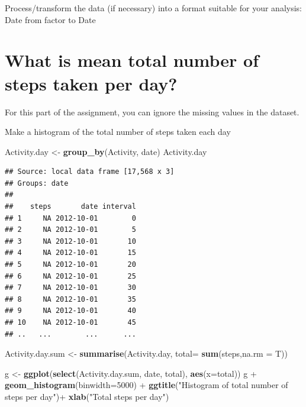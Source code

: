 \documentclass[]{article}
\newenvironment{Shaded}{\begin{snugshade}}{\end{snugshade}}
\newcommand{\KeywordTok}[1]{\textcolor[rgb]{0.13,0.29,0.53}{\textbf{{#1}}}}
\newcommand{\DataTypeTok}[1]{\textcolor[rgb]{0.13,0.29,0.53}{{#1}}}
\newcommand{\DecValTok}[1]{\textcolor[rgb]{0.00,0.00,0.81}{{#1}}}
\newcommand{\StringTok}[1]{\textcolor[rgb]{0.31,0.60,0.02}{{#1}}}
\newcommand{\CommentTok}[1]{\textcolor[rgb]{0.56,0.35,0.01}{\textit{{#1}}}}
\newcommand{\NormalTok}[1]{{#1}}
\begin{document}
Process/transform the data (if necessary) into a format suitable for
your analysis: Date from factor to Date

\begin{Shaded}
\end{Shaded}

\section{What is mean total number of steps taken per
day?}\label{what-is-mean-total-number-of-steps-taken-per-day}

For this part of the assignment, you can ignore the missing values in
the dataset.

Make a histogram of the total number of steps taken each day

\begin{Shaded}
\begin{Highlighting}[]
\NormalTok{Activity.day <-}\StringTok{ }\KeywordTok{group_by}\NormalTok{(Activity, date) }
\NormalTok{Activity.day}
\end{Highlighting}
\end{Shaded}

\begin{verbatim}
## Source: local data frame [17,568 x 3]
## Groups: date
## 
##    steps       date interval
## 1     NA 2012-10-01        0
## 2     NA 2012-10-01        5
## 3     NA 2012-10-01       10
## 4     NA 2012-10-01       15
## 5     NA 2012-10-01       20
## 6     NA 2012-10-01       25
## 7     NA 2012-10-01       30
## 8     NA 2012-10-01       35
## 9     NA 2012-10-01       40
## 10    NA 2012-10-01       45
## ..   ...        ...      ...
\end{verbatim}

\begin{Shaded}
\begin{Highlighting}[]
\NormalTok{Activity.day.sum <-}\StringTok{ }\KeywordTok{summarise}\NormalTok{(Activity.day, }\DataTypeTok{total=} \KeywordTok{sum}\NormalTok{(steps,}\DataTypeTok{na.rm =} \NormalTok{T))}



\NormalTok{g <-}\StringTok{ }\KeywordTok{ggplot}\NormalTok{(}\KeywordTok{select}\NormalTok{(Activity.day.sum, date, total), }\KeywordTok{aes}\NormalTok{(}\DataTypeTok{x=}\NormalTok{total))}
\NormalTok{g +}\StringTok{ }\KeywordTok{geom_histogram}\NormalTok{(}\DataTypeTok{binwidth=}\DecValTok{5000}\NormalTok{) +}\StringTok{ }\KeywordTok{ggtitle}\NormalTok{(}\StringTok{"Histogram of total number of steps per day"}\NormalTok{)+}\StringTok{ }\KeywordTok{xlab}\NormalTok{(}\StringTok{"Total steps per day"}\NormalTok{)}
\end{Highlighting}
\end{Shaded}
\end{document}
